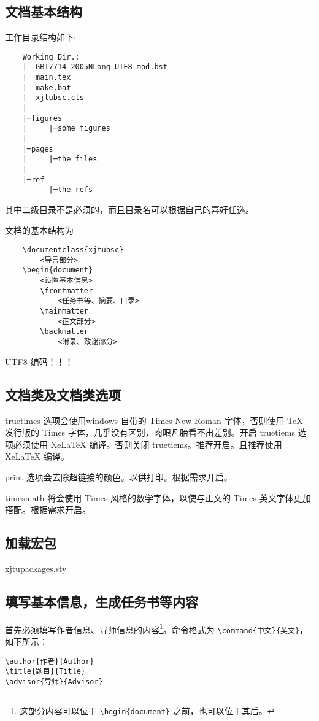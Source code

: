 \documentclass[%
               print, 
               timesmath
              ]{xjtubsc}
\begin{document}
\subsection{文档基本结构}
工作目录结构如下:
\begin{verbatim}
    Working Dir.:
    |  GBT7714-2005NLang-UTF8-mod.bst
    |  main.tex
    |  make.bat
    |  xjtubsc.cls
    |
    |─figures
    |     |─some figures
    |
    |─pages
    |     |─the files
    |
    |─ref
          |─the refs
\end{verbatim}
其中二级目录不是必须的，而且目录名可以根据自己的喜好任选。

文档的基本结构为
\begin{verbatim}
    \documentclass{xjtubsc}
        <导言部分>
    \begin{document}
        <设置基本信息>
        \frontmatter  
            <任务书等、摘要、目录>
        \mainmatter
            <正文部分>
        \backmatter
            <附录、致谢部分>
\end{verbatim}

UTF8 编码！！！
\subsection{文档类及文档类选项}

truetimes 选项会使用windows 自带的 Times New Roman 字体，否则使用 TeX 发行版的 Times 字体，几乎没有区别，肉眼凡胎看不出差别。开启 truetiems 选项必须使用 XeLaTeX 编译。否则关闭 truetiems。推荐开启。且推荐使用 XeLaTeX 编译。

print 选项会去除超链接的颜色。以供打印。根据需求开启。

timesmath 将会使用 Times 风格的数学字体，以使与正文的 Times 英文字体更加搭配。根据需求开启。

\subsection{加载宏包}
xjtupackages.sty

\subsection{填写基本信息，生成任务书等内容}

首先必须填写作者信息、导师信息的内容\footnote{这部分内容可以位于 \verb+\begin{document}+ 之前，也可以位于其后。}。命令格式为 \verb|\command{中文}{英文}|，如下所示：
\begin{verbatim}
\author{作者}{Author}
\title{题目}{Title}
\advisor{导师}{Advisor}
\end{verbatim}
\end{document}
